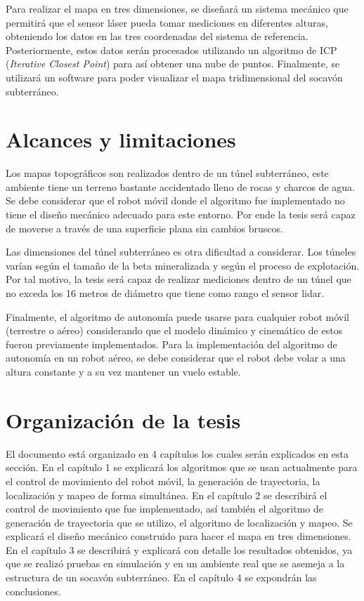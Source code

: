 Para realizar el mapa en tres dimensiones, se diseñar\'a un sistema mec\'anico 
que permitir\'a que el sensor l\'aser pueda tomar mediciones en diferentes 
alturas, obteniendo los datos en las tres coordenadas del sistema de 
referencia. Posteriormente, estos datos serán procesados utilizando un 
algoritmo de ICP (\textit{Iterative Closest Point}) para as\'i obtener una 
nube de puntos. Finalmente, se utilizar\'a un software para poder visualizar 
el mapa tridimensional del socavón subterr\'aneo.

\section{Alcances y limitaciones}

Los mapas topográficos son realizados dentro de un túnel subterráneo, este ambiente 
tiene un terreno bastante accidentado lleno de rocas y charcos de agua. Se debe 
considerar que el robot móvil donde el algoritmo fue implementado no tiene el 
diseño mecánico adecuado para este entorno. Por ende la tesis será capaz de 
moverse a través de una superficie plana sin cambios bruscos.

Las dimensiones del túnel subterráneo es otra dificultad a considerar. Los túneles
varían según el tamaño de la beta mineralizada y según el proceso de explotación. Por 
tal motivo, la tesis será capaz de realizar mediciones dentro de un túnel 
que no exceda los 16 metros de diámetro que tiene como rango el sensor lidar.

Finalmente, el algoritmo de autonom\'ia puede usarse para cualquier robot 
m\'ovil (terrestre o a\'ereo) considerando que el modelo din\'amico y cinem\'atico 
de estos fueron previamente implementados. Para la implementación del algoritmo 
de autonomía en un robot aéreo, se debe considerar que el robot debe volar a una 
altura constante y a su vez mantener un vuelo estable.

\section{Organizaci\'on de la tesis}

El documento está organizado en 4 capítulos los cuales serán explicados en esta
sección. En el capítulo 1 se explicará los algoritmos que se usan actualmente para el 
control de movimiento del robot móvil, la generación de trayectoria, la localización y 
mapeo de forma simultánea. En el capítulo 2 se describirá el control de movimiento que 
fue implementado, así también el algoritmo de generación de trayectoria que se utilizo, 
el algoritmo de localización y mapeo. Se explicará el diseño mecánico construido
para hacer el mapa en tres dimensiones. En el capítulo 3 se describirá y explicará con detalle
los resultados obtenidos, ya que se realizó pruebas en simulación y en un ambiente real que 
se asemeja a la estructura de un socavón subterráneo. En el capítulo 4 se expondrán las conclusiones.